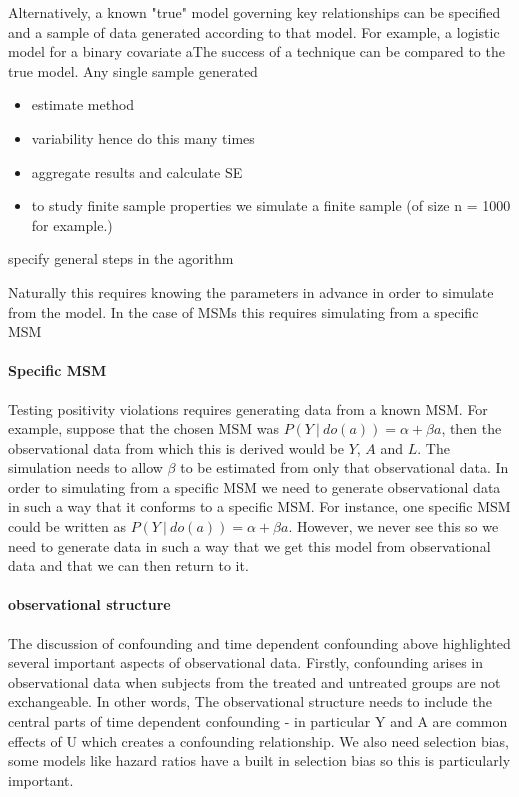 \documentclass[11pt]{article}
\providecommand{\tightlist}{%
      \setlength{\itemsep}{0pt}\setlength{\parskip}{0pt}}
\begin{document}
Alternatively, a known "true" model governing key relationships can be
specified and a sample of data generated according to that model. For
example, a logistic model for a binary covariate aThe success of a
technique can be compared to the true model. Any single sample generated

\begin{itemize}
\tightlist
\item
  estimate method
\item
  variability hence do this many times
\item
  aggregate results and calculate SE
\item
  to study finite sample properties we simulate a finite sample (of size
  n = 1000 for example.)
\end{itemize}

specify general steps in the agorithm

Naturally this requires knowing the parameters in advance in order to
simulate from the model. In the case of MSMs this requires simulating
from a specific MSM

\paragraph{Specific MSM}\label{specific-msm}

Testing positivity violations requires generating data from a known MSM.
For example, suppose that the chosen MSM was
\(P(Y\ |\ do(a)) = \alpha + \beta a\), then the observational data from
which this is derived would be \(Y\), \(A\) and \(L\). The simulation
needs to allow \(\beta\) to be estimated from only that observational
data. In order to simulating from a specific MSM we need to generate
observational data in such a way that it conforms to a specific MSM. For
instance, one specific MSM could be written as
\(P(Y\ |\ do(a)) = \alpha + \beta a\). However, we never see this so we
need to generate data in such a way that we get this model from
observational data and that we can then return to it.

\paragraph{observational structure}\label{observational-structure}

The discussion of confounding and time dependent confounding above
highlighted several important aspects of observational data. Firstly,
confounding arises in observational data when subjects from the treated
and untreated groups are not exchangeable. In other words, The
observational structure needs to include the central parts of time
dependent confounding - in particular Y and A are common effects of U
which creates a confounding relationship. We also need selection bias,
some models like hazard ratios have a built in selection bias so this is
particularly important.
\end{document}
